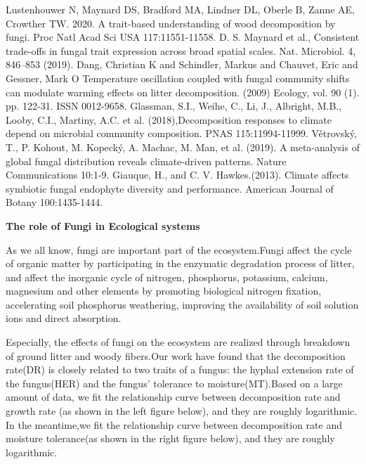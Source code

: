 \documentclass{mcmthesis}
\begin{document}
\begin{thebibliography}{10}  
	Lustenhouwer N, Maynard DS, Bradford MA, Lindner DL, Oberle B, Zanne
	AE, Crowther TW. 2020. A trait-based understanding of wood decomposition by fungi. Proc Natl Acad Sci USA 117:11551-11558.
	D. S. Maynard et al., Consistent trade-offs in fungal trait expression across broad spatial scales. Nat. Microbiol. 4, 846–853 (2019).
	Dang, Christian K and Schindler, Markus and Chauvet, Eric and Gessner, Mark O Temperature oscillation coupled with fungal community shifts can modulate warming effects on litter decomposition. (2009) Ecology, vol. 90 (1). pp. 122-31.
	ISSN 0012-9658.
	Glassman, S.I., Weihe, C., Li, J., Albright, M.B., Looby, C.I., Martiny, A.C. et al. (2018),Decomposition responses to climate depend on microbial community composition. PNAS 115:11994-11999. 
	Větrovský, T., P. Kohout, M. Kopecký, A. Machac, M. Man, et al. (2019). A meta-analysis of global fungal distribution reveals climate-driven patterns. Nature Communications 10:1-9.
	Giauque, H., and C. V. Hawkes.(2013). Climate affects symbiotic fungal endophyte diversity and performance. American Journal of Botany 100:1435-1444.
\end{thebibliography}
\newpage
\begin{center}
	\LARGE
	\textbf{The role of Fungi in Ecological systems}
\end{center}

As we all know, fungi are important part of the ecosystem.Fungi affect the cycle of organic matter by participating in the enzymatic degradation process of litter, and affect the inorganic cycle of nitrogen, phosphorus, potassium, calcium, magnesium and other elements by promoting biological nitrogen fixation, accelerating soil phosphorus weathering, improving the availability of soil solution ions and direct absorption.

\begin{figure}[h]
	\centering 
\end{figure}

Especially, the effects of fungi on the ecosystem are realized through breakdown of ground litter and woody fibers.Our work have found that the decomposition rate(DR) is closely related to two traits of a fungus: the hyphal extension rate of the fungus(HER) and the fungus’ tolerance to moisture(MT).Based on a large amount of data, we fit the relationship curve between decomposition rate and growth rate (as shown in the left figure below), and they are roughly logarithmic. In the meantime,we fit the relationship curve between decomposition rate and moisture tolerance(as shown in the right figure below), and they are roughly logarithmic.
\end{document}
